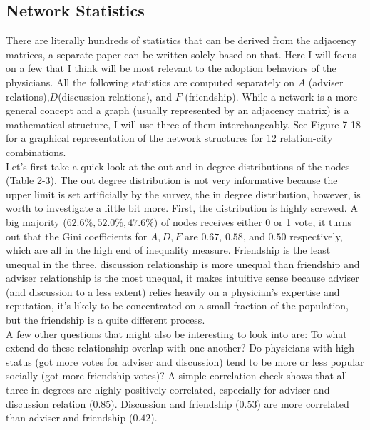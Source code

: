 \documentclass[11pt]{article}
\begin{document}
\subsection{Network Statistics}
There are literally hundreds of statistics that can be derived from the adjacency matrices, a separate paper can be written solely based on that. Here I will focus on a few that I think will be most relevant to the adoption behaviors of the physicians.  All the following statistics are computed separately on $A$ (adviser relations),$D$(discussion relations), and $F$ (friendship). While a network is a more general concept and a graph (usually represented by an adjacency matrix) is a mathematical structure, I will use three of them interchangeably. See Figure 7-18 for a graphical representation of the network structures for 12 relation-city combinations.\\

Let's first take a quick look at the out and in degree distributions of the nodes (Table 2-3). The out degree distribution is not very informative because the upper limit is set artificially by the survey, the in degree distribution, however, is worth to investigate a little bit more. First, the distribution is highly screwed. A big majority ($62.6\%, 52.0\%, 47.6\%$) of nodes receives either 0 or 1 vote, it turns out that the Gini coefficients for $A,D,F$ are $0.67$, $0.58$, and $0.50$ respectively, which are all in the high end of inequality measure. Friendship is the least unequal in the three, discussion relationship is more unequal than friendship and adviser relationship is the most unequal, it makes intuitive sense because adviser (and discussion to a less extent) relies heavily on a physician's expertise and reputation, it's likely to be concentrated on a small fraction of the population, but the friendship is a quite different process. \\ 

A few other questions that might also be interesting to look into are: To what extend do these relationship overlap with one another? Do physicians with high status (got more votes for adviser and discussion) tend to be more or less popular socially (got more friendship votes)? A simple correlation check shows that all three in degrees are highly positively correlated, especially for adviser and discussion relation ($0.85$). Discussion and friendship ($0.53$) are more correlated than adviser and friendship ($0.42$). \\
\end{document}
